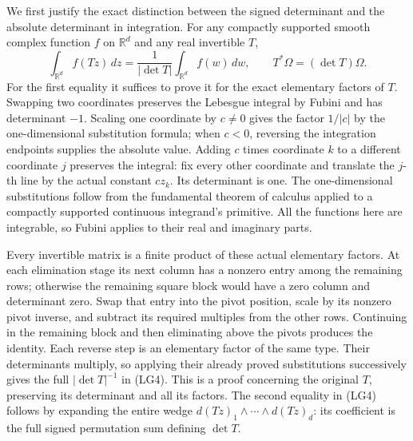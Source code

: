 \documentclass[
  11pt,
]{article}
\begin{document}
We first justify the exact distinction between the signed determinant
and the absolute determinant in integration. For any compactly supported
smooth complex function \(f\) on \(\mathbb R^d\) and any real invertible
\(T\), \[
 \int_{\mathbb R^d}f(Tz)\,dz
       =\frac1{|\det T|}\int_{\mathbb R^d}f(w)\,dw,
 \qquad T^*\Omega=(\det T)\Omega.
 \tag{LG4}
\] For the first equality it suffices to prove it for the exact
elementary factors of \(T\). Swapping two coordinates preserves the
Lebesgue integral by Fubini and has determinant \(-1\). Scaling one
coordinate by \(c\ne0\) gives the factor \(1/|c|\) by the
one-dimensional substitution formula; when \(c<0\), reversing the
integration endpoints supplies the absolute value. Adding \(c\) times
coordinate \(k\) to a different coordinate \(j\) preserves the integral:
fix every other coordinate and translate the \(j\)-th line by the actual
constant \(cz_k\). Its determinant is one. The one-dimensional
substitutions follow from the fundamental theorem of calculus applied to
a compactly supported continuous integrand's primitive. All the
functions here are integrable, so Fubini applies to their real and
imaginary parts.

Every invertible matrix is a finite product of these actual elementary
factors. At each elimination stage its next column has a nonzero entry
among the remaining rows; otherwise the remaining square block would
have a zero column and determinant zero. Swap that entry into the pivot
position, scale by its nonzero pivot inverse, and subtract its required
multiples from the other rows. Continuing in the remaining block and
then eliminating above the pivots produces the identity. Each reverse
step is an elementary factor of the same type. Their determinants
multiply, so applying their already proved substitutions successively
gives the full \(|\det T|^{-1}\) in (LG4). This is a proof concerning
the original \(T\), preserving its determinant and all its factors. The
second equality in (LG4) follows by expanding the entire wedge
\(d(Tz)_1\wedge\cdots\wedge d(Tz)_d\): its coefficient is the full
signed permutation sum defining \(\det T\).
\end{document}
